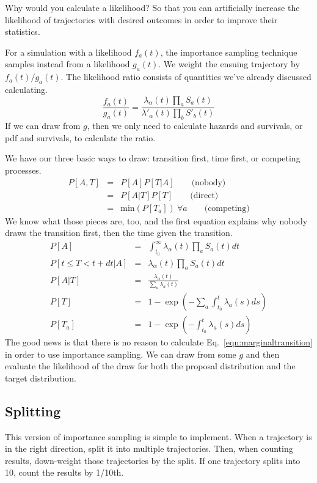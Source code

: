 \documentclass{article}
\begin{document}
Why would you calculate a likelihood? So that you can artificially increase the likelihood of trajectories with desired outcomes in order to improve their statistics.

For a simulation with a likelihood $f_a(t)$, the importance sampling technique samples instead from a likelihood $g_a(t)$. We weight the ensuing trajectory by $f_a(t)/g_a(t)$. The likelihood ratio consists of quantities we've already discussed calculating.
\begin{equation}
	\frac{f_a(t)}{g_a(t)} = \frac{\lambda_{\alpha}(t)\prod_{a}S_a(t)}{\lambda'_{\alpha}(t)\prod_{b}S'_b(t)}\label{eqn:likelihoodratio}
\end{equation}
If we can draw from $g$, then we only need to calculate hazards and survivals, or pdf and survivals, to calculate the ratio.

We have our three basic ways to draw: transition first, time first, or competing processes.
\begin{eqnarray}
	P[A,T]&=&P[A]P[T|A]\qquad\mbox{(nobody)} \\
	&=&P[A|T]P[T]\qquad\mbox{(direct)}\\
	&=&\mbox{min}(P[T_a])\ \forall a\qquad\mbox{(competing)}
\end{eqnarray}
We know what those pieces are, too, and the first equation explains why nobody draws the transition first, then the time given the transition.
\begin{eqnarray}
	P[A] & = & \int_{t_0}^\infty \lambda_{\alpha}(t)\prod_{a}S_a(t)dt\label{eqn:marginaltransition} \\
	P[t\le T<t+dt|A] & = & \lambda_{\alpha}(t)\prod_{a}S_a(t)dt \\
	P[A|T] & = & \frac{\lambda_\alpha(t)}{\sum_a\lambda_a(t)} \\
	P[T] & = & 1-\exp(-\sum_a\int_{t_0}^t\lambda_a(s)ds) \\
	P[T_a] & = & 1-\exp(-\int_{t_0}^t \lambda_a(s)ds)
\end{eqnarray}
The good news is that there is no reason to calculate Eq.~\ref{eqn:marginaltransition} in order to use importance sampling. We can draw from some $g$ and then evaluate the likelihood of the draw for both the proposal distribution and the target distribution.


\subsection{Splitting}

This version of importance sampling is simple to implement. When a trajectory is in the right direction, split it into multiple trajectories. Then, when counting results, down-weight those trajectories by the split. If one trajectory splits into 10, count the results by 1/10th.
\end{document}
